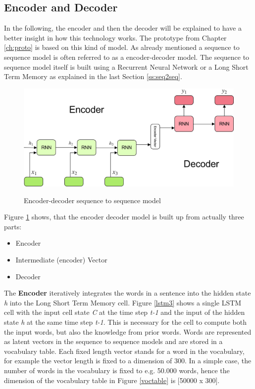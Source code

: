 \subsection{Encoder and Decoder}\label{ss:encdec}

In the following, the encoder and then the decoder will be explained to have a better insight in how this technology works. The prototype from Chapter \ref{ch:proto} is based on this kind of model. As already mentioned a sequence to sequence model is often referred to as a encoder-decoder model. The sequence to sequence model itself is built using a Recurrent Neural Network or a Long Short Term Memory as explained in the last Section \ref{ss:seq2seq}.

\begin{figure}
	\begin{center}
		\includegraphics[width=4.5in]{photos/encoderdecoder.jpeg}\\
		\caption{Encoder-decoder sequence to sequence model \cite{encdec}}\label{encdecseq}
	\end{center}
\end{figure}

Figure \ref{encdecseq} shows, that the encoder decoder model is built up from actually three parts:

\begin{itemize}
	\item Encoder
	\item Intermediate (encoder) Vector
	\item Decoder
\end{itemize}


The \textbf{Encoder} iteratively integrates the words in a sentence into the hidden state \textit{h} into the Long Short Term Memory cell.
Figure \ref{lstm3} shows a single LSTM cell with the input cell state \textit{C} at the time step \textit{t-1}  and the input of the hidden state \textit{h} at the same time step \textit{t-1}. This is necessary for the cell to compute both the input words, but also the knowledge from prior words. Words are represented as latent vectors in the sequence to sequence models and are stored in a vocabulary table. Each fixed length vector stands for a word in the vocabulary, for example the vector length is fixed to a dimension of 300. In a simple case, the number of words in the vocabulary is fixed to e.g. 50.000 words, hence the dimension of the vocabulary table in Figure \ref{voctable} is [50000 x 300]. 

